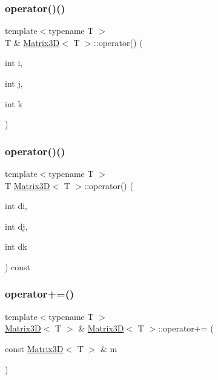 \mbox{\label{classMatrix3D_a56e772adacd4ccf54388e6c90e3d1269_a56e772adacd4ccf54388e6c90e3d1269}} 
\subsubsection{\texorpdfstring{operator()()}{operator()()}\hspace{0.1cm}{\footnotesize\ttfamily [1/2]}}
{\footnotesize\ttfamily template$<$typename T $>$ \\
T \& \mbox{\hyperlink{classMatrix3D}{Matrix3D}}$<$ T $>$\+::operator() (\begin{DoxyParamCaption}\item[{int}]{i,  }\item[{int}]{j,  }\item[{int}]{k }\end{DoxyParamCaption})}

\mbox{\label{classMatrix3D_a600c100c8204bbc8f2e4ebefa55cab82_a600c100c8204bbc8f2e4ebefa55cab82}} 
\subsubsection{\texorpdfstring{operator()()}{operator()()}\hspace{0.1cm}{\footnotesize\ttfamily [2/2]}}
{\footnotesize\ttfamily template$<$typename T $>$ \\
T \mbox{\hyperlink{classMatrix3D}{Matrix3D}}$<$ T $>$\+::operator() (\begin{DoxyParamCaption}\item[{int}]{di,  }\item[{int}]{dj,  }\item[{int}]{dk }\end{DoxyParamCaption}) const}

\mbox{\label{classMatrix3D_a10b206ad9106931f7aa46a7b4d45c851_a10b206ad9106931f7aa46a7b4d45c851}} 
\subsubsection{\texorpdfstring{operator+=()}{operator+=()}}
{\footnotesize\ttfamily template$<$typename T $>$ \\
\mbox{\hyperlink{classMatrix3D}{Matrix3D}}$<$ T $>$ \& \mbox{\hyperlink{classMatrix3D}{Matrix3D}}$<$ T $>$\+::operator+= (\begin{DoxyParamCaption}\item[{const \mbox{\hyperlink{classMatrix3D}{Matrix3D}}$<$ T $>$ \&}]{m }\end{DoxyParamCaption})}

